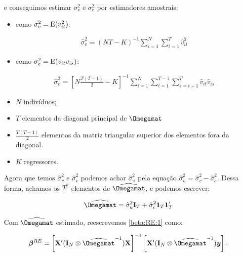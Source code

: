 \documentclass[11pt, oneside, a4paper, article]{article}
\numberwithin{equation}{section}
\begin{document}
\begin{description}
\noindent
e conseguimos estimar $\sigma_{v}^{2}$ e $\sigma_{c}^{2}$ por estimadores amostrais:

\begin{itemize}\itemsep0pt
\item 
como $\sigma_{v}^{2} = \text{E}(v_{it}^{2})$:

\vspace{-1.5 em}
\begin{align*}
\hat{\sigma}_{v}^{2} =
(NT - K)^{-1} 
\sum_{i=1}^{N}
\sum_{t=1}^{T}
\hat{v}_{it}^2
\end{align*}
\vspace{-1.5 em}

\item 
como $\sigma_{c}^{2} = \text{E}(v_{it} v_{is})$:

\vspace{-1.5 em}
\begin{align*}
\hat{\sigma}_{c}^{2} =
\left[ N \frac{T ( T-1 )}{2} - K  \right]^{-1}
\sum_{i=1}^{N}
\sum_{t=1}^{T-1}
\sum_{s=t+1}^{T}
\hat{v}_{it} \hat{v}_{is}
\end{align*}
\vspace{-1.5 em}

\item $N$ indivíduos;

\item $T$ elementos da diagonal principal de $\Omegamat$

\item $\frac{T ( T - 1)}{2}$ elementos da matriz triangular superior dos elementos fora da diagonal.

\item $K$ regressores.
\end{itemize}

Agora que temos $\hat{\sigma}^2_{v}$ e $\hat{\sigma}^2_{c}$ podemos achar $\hat{\sigma}^{2}_{u}$ pela equação $\boxed{\hat{\sigma}_{u}^{2} = \hat{\sigma}_{v}^{2} - \hat{\sigma}_{c}^{2}}$.
Dessa forma, achamos os $T^2$ elementos de $\widehat{\Omegamat}$, e podemos escrever:

\vspace{-1 em}
\begin{align*}
\widehat{\Omegamat}
= 
\hat{\sigma}^{2}_{u} \Imat_{T} + \hat{\sigma}_{c}^{2} \onevec_{T} \onevec_{T}'
\end{align*}

Com $\widehat{\Omegamat}$ estimado, reescrevemos \eqref{beta:RE:1} como:

\vspace{-1 em}
\begin{align} \label{beta:RE:2}
\betavec^{RE} = 
\left[ \Xmat' (\Imat_{N} \otimes \widehat{\Omegamat}^{-1}) \Xmat \right]^{-1}
\left[ \Xmat' (\Imat_{N} \otimes \widehat{\Omegamat}^{-1}) \yvec \right].
\end{align}


\end{description}
\end{document}
